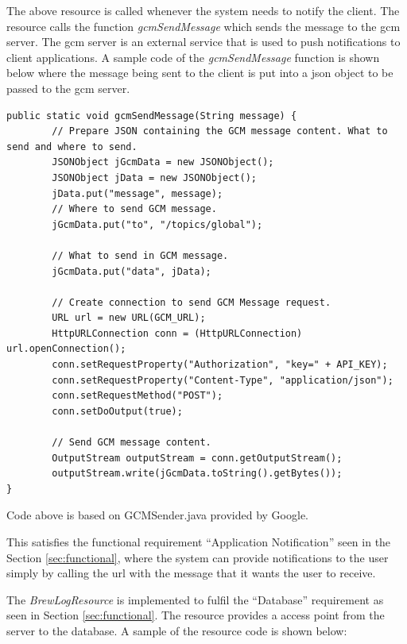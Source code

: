 \documentclass{article}
\begin{document}
The above resource is called whenever the system needs to notify the client. The resource calls the function \textit{gcmSendMessage} which sends the message to the \gls{gcm} server. The \gls{gcm} server is an external service that is used to push notifications to client applications. A sample code of the \textit{gcmSendMessage} function is shown below where the message being sent to the client is put into a \gls{json} object to be passed to the \gls{gcm} server. 

\begin{lstlisting}
public static void gcmSendMessage(String message) {
        // Prepare JSON containing the GCM message content. What to send and where to send.
        JSONObject jGcmData = new JSONObject();
        JSONObject jData = new JSONObject();
        jData.put("message", message);
        // Where to send GCM message.
        jGcmData.put("to", "/topics/global");
       
        // What to send in GCM message.
        jGcmData.put("data", jData);

        // Create connection to send GCM Message request.
        URL url = new URL(GCM_URL);
        HttpURLConnection conn = (HttpURLConnection) url.openConnection();
        conn.setRequestProperty("Authorization", "key=" + API_KEY);
        conn.setRequestProperty("Content-Type", "application/json");
        conn.setRequestMethod("POST");
        conn.setDoOutput(true);

        // Send GCM message content.
        OutputStream outputStream = conn.getOutputStream();
        outputStream.write(jGcmData.toString().getBytes());
}
\end{lstlisting}
\cite{gcm-sendnotification} Code above is based on GCMSender.java provided by Google.

This satisfies the functional requirement ``Application Notification'' seen in the  Section \ref{sec:functional}, where the system can provide notifications to the user simply by calling the \gls{url} with the message that it wants the user to receive.

\noindent The \textit{BrewLogResource}  is implemented to fulfil the ``Database'' requirement as seen in  Section \ref{sec:functional}. The resource provides a access point from the server to the database. A sample of the resource code is shown below:
 
\end{document}
